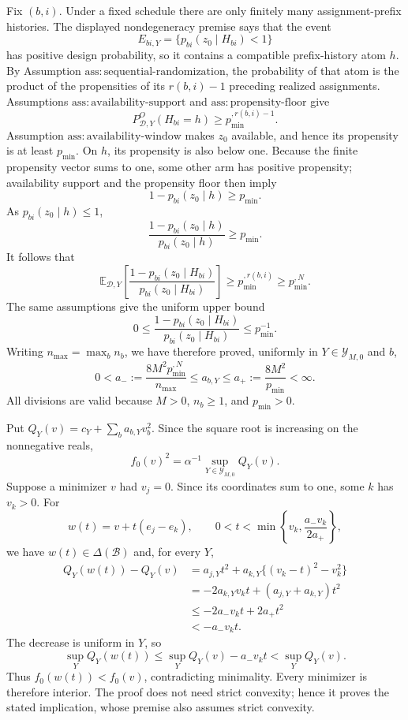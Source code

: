 Fix \((b,i)\).  Under a fixed schedule there are only finitely many assignment-prefix histories.  The displayed nondegeneracy premise says that the event
\[
 E_{bi,Y}=\{p_{bi}(z_0\mid H_{bi})<1\}
\]
has positive design probability, so it contains a compatible prefix-history atom \(h\).  By Assumption \(\mathrm{ass:sequential\text{-}randomization}\), the probability of that atom is the product of the propensities of its \(r(b,i)-1\) preceding realized assignments.  Assumptions \(\mathrm{ass:availability\text{-}support}\) and \(\mathrm{ass:propensity\text{-}floor}\) give
\[
 P^O_{\mathcal D,Y}(H_{bi}=h)\ge p_{\min}^{,r(b,i)-1}.
\]
Assumption \(\mathrm{ass:availability\text{-}window}\) makes \(z_0\) available, and hence its propensity is at least \(p_{\min}\).  On \(h\), its propensity is also below one.  Because the finite propensity vector sums to one, some other arm has positive propensity; availability support and the propensity floor then imply
\[
 1-p_{bi}(z_0\mid h)\ge p_{\min}.
\]
As \(p_{bi}(z_0\mid h)\le1\),
\[
 \frac{1-p_{bi}(z_0\mid h)}{p_{bi}(z_0\mid h)}\ge p_{\min}.
\]
It follows that
\[
 \mathbb E_{\mathcal D,Y}\!\left[
 \frac{1-p_{bi}(z_0\mid H_{bi})}{p_{bi}(z_0\mid H_{bi})}
 \right]
 \ge p_{\min}^{,r(b,i)}\ge p_{\min}^{,N}.
\]
The same assumptions give the uniform upper bound
\[
 0\le
 \frac{1-p_{bi}(z_0\mid H_{bi})}{p_{bi}(z_0\mid H_{bi})}
 \le p_{\min}^{-1}.
\]
Writing \(n_{\max}=\max_b n_b\), we have therefore proved, uniformly in \(Y\in\mathcal Y_{M,0}\) and \(b\),
\[
 0<a_-:=\frac{8M^2p_{\min}^{,N}}{n_{\max}}
 \le a_{b,Y}
 \le a_+:=\frac{8M^2}{p_{\min}}<\infty.
\]
All divisions are valid because \(M>0\), \(n_b\ge1\), and \(p_{\min}>0\).

Put \(Q_Y(v)=c_Y+\sum_ba_{b,Y}v_b^2\).  Since the square root is increasing on the nonnegative reals,
\[
 f_0(v)^2=\alpha^{-1}\sup_{Y\in\mathcal Y_{M,0}}Q_Y(v).
\]
Suppose a minimizer \(v\) had \(v_j=0\).  Since its coordinates sum to one, some \(k\) has \(v_k>0\).  For
\[
 w(t)=v+t(e_j-e_k),
 \qquad
 0<t<\min\!\left\{v_k,\frac{a_-v_k}{2a_+}\right\},
\]
we have \(w(t)\in\Delta(\mathcal B)\) and, for every \(Y\),
\[
 \begin{aligned}
 Q_Y(w(t))-Q_Y(v)
 &=a_{j,Y}t^2+a_{k,Y}\{(v_k-t)^2-v_k^2\}\\
 &=-2a_{k,Y}v_kt+(a_{j,Y}+a_{k,Y})t^2\\
 &\le-2a_-v_kt+2a_+t^2\\
 &<-a_-v_kt.
 \end{aligned}
\]
The decrease is uniform in \(Y\), so
\[
 \sup_YQ_Y(w(t))
 \le\sup_YQ_Y(v)-a_-v_kt
 <\sup_YQ_Y(v).
\]
Thus \(f_0(w(t))<f_0(v)\), contradicting minimality.  Every minimizer is therefore interior.  The proof does not need strict convexity; hence it proves the stated implication, whose premise also assumes strict convexity.

